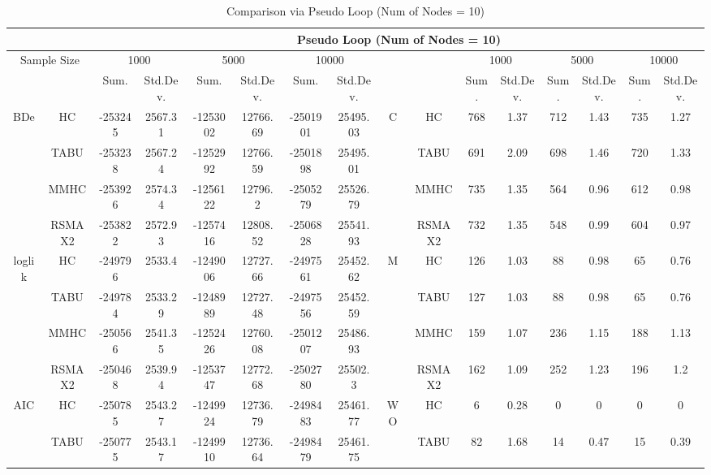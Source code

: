 \begin{table}[p]																										
\centering	\caption{Comparison via Pseudo Loop (Num of Nodes = 10)}	\tiny																						
{\tabcolsep=0.01in																										
\begin{tabular}{cc||cc|cc|cc||cc|cc|cc|cc}																										
\hline																										
&	&	\multicolumn{14}{c}{Pseudo Loop	(Num	of	Nodes	=	10)}\tabularnewline																			
\hline																										
\multicolumn{2}{c||}{Sample	Size}	&	\multicolumn{2}{c|}{1000}	&	\multicolumn{2}{c|}{5000}	&	\multicolumn{2}{c||}{10000}	&	&	&	\multicolumn{2}{c|}{1000}	&	\multicolumn{2}{c|}{5000}	&	\multicolumn{2}{c}{10000}\tabularnewline											
\hline																										
&	&	Sum.	&	Std.Dev.	&	Sum.	&	Std.Dev.	&	Sum.	&	Std.Dev.	&	&	&	Sum.	&	Std.Dev.	&	Sum.	&	Std.Dev.	&	Sum.	&	Std.Dev.\tabularnewline
\hline																										
\hline																										
\multirow{4}{*}{BDe} & HC &	-253245 & 	2567.31 & 	-1253002 & 	12766.69 & 	-2501901 & 	25495.03 & 	\multirow{4}{*}{C} & HC &	768 & 	1.37 & 	712 & 	1.43 & 	735 & 	1.27\tabularnewline													
& TABU &	-253238 & 	2567.24 & 	-1252992 & 	12766.59 & 	-2501898 & 	25495.01 & 	& TABU &	691 & 	2.09 & 	698 & 	1.46 & 	720 & 	1.33\tabularnewline													
& MMHC &	-253926 & 	2574.34 & 	-1256122 & 	12796.2 & 	-2505279 & 	25526.79 & 	& MMHC &	735 & 	1.35 & 	564 & 	0.96 & 	612 & 	0.98\tabularnewline													
& RSMAX2 &	-253822 & 	2572.93 & 	-1257416 & 	12808.52 & 	-2506828 & 	25541.93 & 	& RSMAX2 &	732 & 	1.35 & 	548 & 	0.99 & 	604 & 	0.97\tabularnewline													
\hline																										
\multirow{4}{*}{loglik} & HC &	-249796 & 	2533.4 & 	-1249006 & 	12727.66 & 	-2497561 & 	25452.62 & 	\multirow{4}{*}{M} & HC &	126 & 	1.03 & 	88 & 	0.98 & 	65 & 	0.76\tabularnewline													
& TABU &	-249784 & 	2533.29 & 	-1248989 & 	12727.48 & 	-2497556 & 	25452.59 & 	& TABU &	127 & 	1.03 & 	88 & 	0.98 & 	65 & 	0.76\tabularnewline													
& MMHC &	-250566 & 	2541.35 & 	-1252426 & 	12760.08 & 	-2501207 & 	25486.93 & 	& MMHC &	159 & 	1.07 & 	236 & 	1.15 & 	188 & 	1.13\tabularnewline													
& RSMAX2 &	-250468 & 	2539.94 & 	-1253747 & 	12772.68 & 	-2502780 & 	25502.3 & 	& RSMAX2 &	162 & 	1.09 & 	252 & 	1.23 & 	196 & 	1.2\tabularnewline													
\hline																										
\multirow{4}{*}{AIC} & HC &	-250785 & 	2543.27 & 	-1249924 & 	12736.79 & 	-2498483 & 	25461.77 & 	\multirow{4}{*}{WO} & HC &	6 & 	0.28 & 	0 & 	0 & 	0 & 	0\tabularnewline													
& TABU &	-250775 & 	2543.17 & 	-1249910 & 	12736.64 & 	-2498479 & 	25461.75 & 	& TABU &	82 & 	1.68 & 	14 & 	0.47 & 	15 & 	0.39\tabularnewline													

\end{tabular}}
\end{table}
